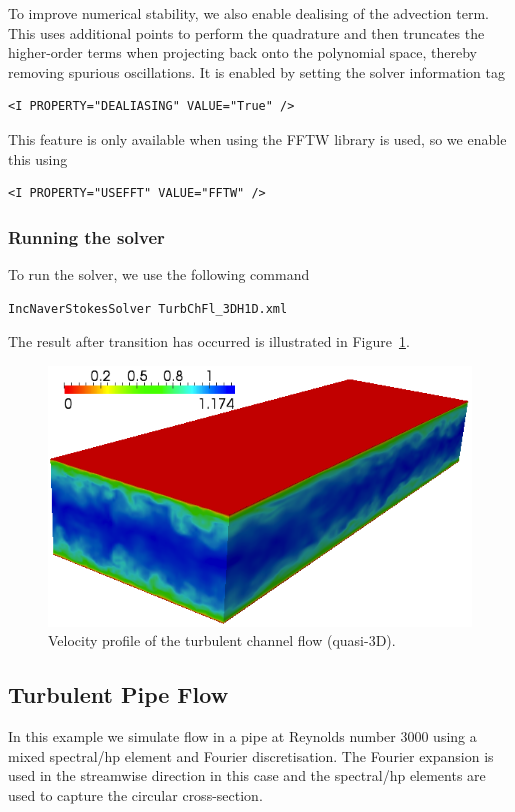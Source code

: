 To improve numerical stability, we also enable dealising of the advection term.
This uses additional points to perform the quadrature and then truncates the
higher-order terms when projecting back onto the polynomial space, thereby
removing spurious oscillations. It is enabled by setting the solver information
tag
\begin{lstlisting}[style=XMLStyle]
<I PROPERTY="DEALIASING" VALUE="True" />
\end{lstlisting}
This feature is only available when using the FFTW library is used, so we enable
this using
\begin{lstlisting}[style=XMLStyle]
<I PROPERTY="USEFFT" VALUE="FFTW" />
\end{lstlisting}


\subsubsection{Running the solver}
To run the solver, we use the following command
\begin{lstlisting}[style=BashInputStyle]
IncNaverStokesSolver TurbChFl_3DH1D.xml
\end{lstlisting}
The result after transition has occurred is illustrated in
Figure~\ref{f:incns:turbchanflow}.

\begin{figure}
\begin{center}
\includegraphics[width=12cm]{img/ChanCont.png}
\caption{Velocity profile of the turbulent channel flow (quasi-3D).}
\label{f:incns:turbchanflow}
\end{center}
\end{figure}


\subsection{Turbulent Pipe Flow}
In this example we simulate flow in a pipe at Reynolds number 3000 using a mixed
spectral/hp element and Fourier discretisation. The Fourier expansion is used in
the streamwise direction in this case and the spectral/hp elements are used to
capture the circular cross-section.

